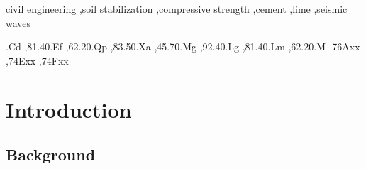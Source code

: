 \documentclass[final,3p,times,twocolumn]{elsarticle}
\begin{document}
\begin{frontmatter}
\begin{keyword}

civil engineering \sep soil stabilization \sep compressive strength \sep cement \sep lime \sep seismic waves

.Cd \sep 81.40.Ef \sep 62.20.Qp \sep 83.50.Xa \sep 45.70.Mg \sep 92.40.Lg \sep 81.40.Lm \sep 62.20.M-
\MSC 76Axx \sep 74Exx \sep 74Fxx

\end{keyword}

\end{frontmatter}


\linenumbers
\section{Introduction}

\subsection{Background}
\end{document}

